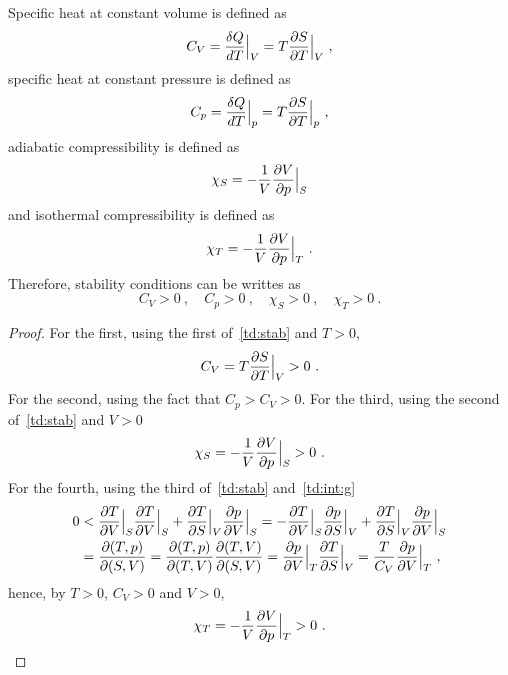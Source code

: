     Specific heat at constant volume is defined as 
    \begin{equation}\label{td:cv}
        C_V = \frac{\delta Q}{d T} \Big \vert_V = T \frac{\partial S}{\partial T} \Big \vert_V ~,
    \end{equation}
    specific heat at constant pressure is defined as 
    \begin{equation}\label{td:cp}
        C_p = \frac{\delta Q}{d T} \Big \vert_p = T \frac{\partial S}{\partial T} \Big \vert_p ~,
    \end{equation}
    adiabatic compressibility is defined as 
    \begin{equation*}
        \chi_S = - \frac{1}{V} \frac{\partial V}{\partial p} \Big \vert_S 
    \end{equation*}
    and isothermal compressibility is defined as 
    \begin{equation}
        \chi_T = - \frac{1}{V} \frac{\partial V}{\partial p} \Big \vert_T ~.
    \end{equation}
    Therefore, stability conditions can be writtes as 
    \begin{equation*}
        C_V > 0 ~, \quad C_p > 0 ~, \quad  \chi_S > 0 ~, \quad \chi_T > 0 ~.
    \end{equation*}
    \begin{proof}
        For the first, using the first of~\eqref{td:stab} and $T > 0$,
        \begin{equation*}
            C_V = T \frac{\partial S}{\partial T} \Big \vert_{V} > 0 ~.
        \end{equation*}
        For the second, using the fact that $C_p > C_V > 0$.
        For the third, using the second of~\eqref{td:stab} and $V > 0$
        \begin{equation*}
            \chi_S = - \frac{1}{V} \frac{\partial V}{\partial p} \Big \vert_S > 0 ~.
        \end{equation*}
        For the fourth, using the third of~\eqref{td:stab} and~\eqref{td:int:g}
        \begin{equation*}
        \begin{aligned}
            0 & < \frac{\partial T}{\partial V} \Big \vert_S \frac{\partial T}{\partial V} \Big \vert_S + \frac{\partial T}{\partial S} \Big \vert_V \frac{\partial p}{\partial V} \Big \vert_S = - \frac{\partial T}{\partial V} \Big \vert_S \frac{\partial p}{\partial S} \Big \vert_V + \frac{\partial T}{\partial S} \Big \vert_V \frac{\partial p}{\partial V} \Big \vert_S \\ & = \frac{\partial(T,p)}{\partial(S,V)} = \frac{\partial(T,p)}{\partial(T,V)} \frac{\partial(T,V)}{\partial(S,V)} = \frac{\partial p}{\partial V} \Big \vert_T \frac{\partial T}{\partial S} \Big \vert_V = \frac{T}{C_V} \frac{\partial p}{\partial V} \Big \vert_T ~,
        \end{aligned}
        \end{equation*}
        hence, by $T>0$, $C_V>0$ and $V>0$, 
        \begin{equation*}
            \chi_T = - \frac{1}{V} \frac{\partial V}{\partial p} \Big \vert_T > 0 ~.
        \end{equation*}
    \end{proof}
